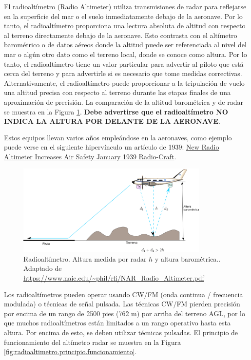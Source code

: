 El radioalt\'imetro (Radio Altimeter) utiliza transmisiones de radar para reflejarse en la superficie del mar o el suelo inmediatamente debajo de la aeronave. Por lo tanto, el radioalt\'imetro proporciona una lectura absoluta de altitud con respecto al terreno directamente debajo de la aeronave. Esto contrasta con el altímetro barométrico o de datos aéreos donde la altitud puede ser referenciada al nivel del mar o algún otro dato como el terreno local, donde se conoce como altura. Por lo tanto, el radioalt\'imetro tiene un valor particular para advertir al piloto que está cerca del terreno y para advertirle si es necesario que tome medidas correctivas. Alternativamente, el radioalt\'imetro puede proporcionar a la tripulación de vuelo una altitud precisa con respecto al terreno durante las etapas finales de una aproximación de precisión. La comparación de la altitud barométrica y de radar se muestra en la Figura \ref{fig:radioaltimetro.funcionamiento}. \textbf{Debe advertirse que el radioalt\'imetro NO INDICA LA ALTURA POR DELANTE DE LA AERONAVE}.

Estos equipos llevan varios a\~nos emple\'andose en la aeronaves, como ejemplo puede verse en el siguiente hiperv\'inculo un art\'iculo de 1939: 
\href{https://www.rfcafe.com/references/radio-craft/radio-altimeter-increases-air-safety-january-1939-radio-craft.htm}{New Radio Altimeter Increases Air Safety
January 1939 Radio-Craft}. 

\begin{figure}[!h]
  \centering
    \includegraphics[width=0.85\textwidth]{06.radionavegacion/Imagenes/06.05.radar/06_radar_0000.png}
  \caption{Radioalt\'imetro. Altura medida por radar $h$ y altura barom\'etrica.. \\{\tiny Adaptado de \,\url{https://www.naic.edu/~phil/rfi/NAR_Radio_Altimeter.pdf}}}
  \label{fig:radioaltimetro.funcionamiento}
\end{figure}


Los radioalt\'imetros pueden operar usando CW/FM (onda continua / frecuencia modulada) o técnicas de señal pulsada. Las técnicas CW/FM pierden precisión por encima de un rango de 2500 pies (762 m) por arriba del terreno \ac{AGL}, por lo que muchos radioaltímetros están limitados a un rango operativo hasta esta altura. Por encima de esto, se deben utilizar técnicas pulsadas. El principio de funcionamiento del altímetro radar se muestra en la Figura \ref{fig:radioaltimetro.principio.funcionamiento}. 

